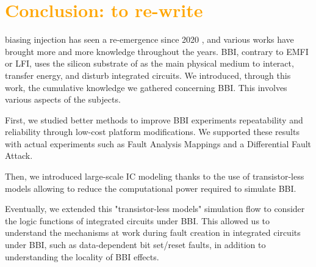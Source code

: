 
\section{\textcolor{orange}{Conclusion: to re-write}}
	 biasing injection has seen a re-emergence since 2020 \cite{bbiColin}, and various works have brought more and more knowledge throughout the years.
	BBI, contrary to EMFI or LFI, uses the silicon substrate of as the main physical medium to interact, transfer energy, and disturb integrated circuits.
	We introduced, through this work, the cumulative knowledge we gathered concerning BBI.
	This involves various aspects of the subjects.

	First, we studied better methods to improve BBI experiments repeatability and reliability through low-cost platform modifications.
	We supported these results with actual experiments such as Fault Analysis Mappings and a Differential Fault Attack.

	Then, we introduced large-scale IC modeling thanks to the use of transistor-less models allowing to reduce the computational power required to simulate BBI.

	Eventually, we extended this "transistor-less models" simulation flow to consider the logic functions of integrated circuits under BBI.
	This allowed us to understand the mechanisms at work during fault creation in integrated circuits under BBI, such as data-dependent bit set/reset faults, in addition to understanding the locality of BBI effects.